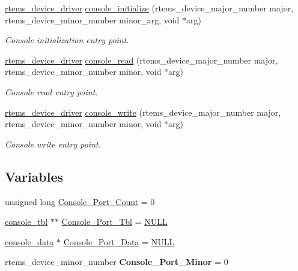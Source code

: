 \begin{DoxyCompactItemize}
\mbox{\hyperlink{group__ClassicStatus_ga545d41846817eaba6143d52ee4d9e9fe}{rtems\+\_\+device\+\_\+driver}} \mbox{\hyperlink{legacy-console_8c_abeb4976a6a67f282ad2095cf9abb93c5}{console\+\_\+initialize}} (rtems\+\_\+device\+\_\+major\+\_\+number major, rtems\+\_\+device\+\_\+minor\+\_\+number minor\+\_\+arg, void $\ast$arg)
\begin{DoxyCompactList}\small\item\em Console initialization entry point. \end{DoxyCompactList}\item 
\mbox{\hyperlink{group__ClassicStatus_ga545d41846817eaba6143d52ee4d9e9fe}{rtems\+\_\+device\+\_\+driver}} \mbox{\hyperlink{legacy-console_8c_affd7cbaa034887f37032640f39c74b0d}{console\+\_\+read}} (rtems\+\_\+device\+\_\+major\+\_\+number major, rtems\+\_\+device\+\_\+minor\+\_\+number minor, void $\ast$arg)
\begin{DoxyCompactList}\small\item\em Console read entry point. \end{DoxyCompactList}\item 
\mbox{\hyperlink{group__ClassicStatus_ga545d41846817eaba6143d52ee4d9e9fe}{rtems\+\_\+device\+\_\+driver}} \mbox{\hyperlink{legacy-console_8c_a211cf468eb7aec89e37bc784a62753ce}{console\+\_\+write}} (rtems\+\_\+device\+\_\+major\+\_\+number major, rtems\+\_\+device\+\_\+minor\+\_\+number minor, void $\ast$arg)
\begin{DoxyCompactList}\small\item\em Console write entry point. \end{DoxyCompactList}\end{DoxyCompactItemize}
\subsection*{Variables}
\begin{DoxyCompactItemize}
\item 
unsigned long \mbox{\hyperlink{legacy-console_8c_a0d8fd810e762900a25000b9acf34df35}{Console\+\_\+\+Port\+\_\+\+Count}} = 0
\item 
\mbox{\hyperlink{struct__console__tbl}{console\+\_\+tbl}} $\ast$$\ast$ \mbox{\hyperlink{legacy-console_8c_a47c39eaf13b8d9c87acba10c2d7fb688}{Console\+\_\+\+Port\+\_\+\+Tbl}} = \mbox{\hyperlink{bestcomm__api_8h_a872bb74de61c3689ccd5b41873fce42c}{N\+U\+LL}}
\item 
\mbox{\hyperlink{serial_8h_ae808572b81efa0deaf4057a9c3e0b5eb}{console\+\_\+data}} $\ast$ \mbox{\hyperlink{legacy-console_8c_a83dec721bc848c432ca3fd874ff7f6d5}{Console\+\_\+\+Port\+\_\+\+Data}} = \mbox{\hyperlink{bestcomm__api_8h_a872bb74de61c3689ccd5b41873fce42c}{N\+U\+LL}}
\item 
\mbox{\label{legacy-console_8c_ac2b6e70e09cf51ece7b205338e419a71}} 
rtems\+\_\+device\+\_\+minor\+\_\+number {\bfseries Console\+\_\+\+Port\+\_\+\+Minor} = 0
\end{DoxyCompactItemize}


